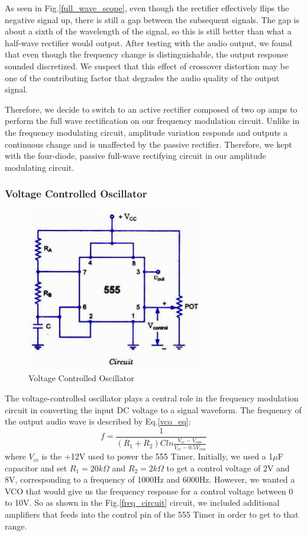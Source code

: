 \documentclass[twocolumn]{article}
\begin{document}
\par As seen in Fig.\ref{full_wave_scope}, even though the rectifier effectively flips the negative signal up, there is still a gap between the subsequent signals. The gap is about a sixth of the wavelength of the signal, so this is still better than what a half-wave rectifier would output. After testing with the audio output, we found that even though the frequency change is distinguishable, the output response sounded discretized. We suspect that this effect of crossover distortion may be one of the contributing factor that degrades the audio quality of the output signal.
\par Therefore, we decide to switch to an active rectifier composed of two op amps to perform the full wave rectification on our frequency modulation circuit.  Unlike in the frequency modulating circuit, amplitude variation responds and outputs a continuous change and is unaffected by the passive rectifier. Therefore, we kept with the four-diode, passive full-wave rectifying circuit in our amplitude modulating circuit. 
\subsubsection{Voltage Controlled Oscillator}
\begin{figure}[h!]
 \centering
 \includegraphics[width=220pt]{figure/vco.png}
\caption{Voltage Controlled Oscillator}
\label{vco}
\end{figure}
The voltage-controlled oscillator plays a central role in the frequency modulation circuit in converting the input DC voltage to a signal waveform. The frequency of the output audio wave is described by Eq.\ref{vco_eq}:
\begin{equation}
f = \frac{1}{(R_1+R_2) C ln \frac{V_{cc}-V_{con}}{V_{cc}-0.5V_{con}}}
\label{vco_eq}
\end{equation}
where $V_{cc}$ is the +12V used to power the 555 Timer. Initially, we used a 1$\mu$F capacitor and set $R_1=20k\Omega$ and $R_2=2k\Omega$ to get a control voltage of 2V and 8V, corresponding to a frequency of 1000Hz and 6000Hz. However, we wanted a VCO that would give us the frequency response for a control voltage between 0 to 10V. So as shown in the Fig.\ref{freq_circuit} circuit, we included additional amplifiers that feeds into the control pin of the 555 Timer in order to get to that range.
\end{document}
